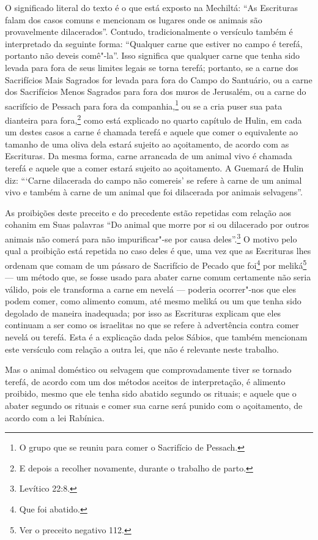 \begin{multicols}{2}
O significado literal do texto é o que está exposto na Mechiltá\starr: ``As
Escrituras falam dos casos comuns e mencionam os lugares onde os
animais são provavelmente dilacerados''. Contudo, tradicionalmente o
versículo também é interpretado da seguinte forma: ``Qualquer carne que
estiver no campo é terefá\starr, portanto não deveis comê"-la''. Isso
significa que qualquer carne que tenha sido levada para fora de seus
limites legais se torna terefá\starr; portanto, se a carne dos Sacrifícios
Mais Sagrados for levada para fora do Campo do Santuário, ou a carne
dos Sacrifícios Menos Sagrados para fora dos muros de Jerusalém, ou a
carne do sacrifício de Pessach\starr{} para fora da companhia,\footnote{O grupo que se reuniu para comer o Sacrifício de Pessach\starr.} ou se a cria puser sua pata dianteira para
fora,\footnote{E depois a recolher novamente, durante o trabalho de parto.} como está explicado no quarto capítulo de
Hulin\starr, em cada um destes casos a carne é chamada terefá\starr{} e aquele que
comer o equivalente ao tamanho de uma oliva dela estará sujeito ao
açoitamento, de acordo com as Escrituras. Da mesma forma, carne
arrancada de um animal vivo é chamada terefá\starr{} e aquele que a comer
estará sujeito ao açoitamento. A Guemará\starr{} de Hulin\starr{} diz: ```Carne
dilacerada do campo não comereis' se refere à carne de um animal vivo e
também à carne de um animal que foi dilacerada por animais selvagens''.

As proibições deste preceito e do precedente estão repetidas com relação
aos cohanim\starr{} em Suas palavras ``Do animal que morre por si ou
dilacerado por outros animais não comerá para não impurificar"-se por
causa deles''.\footnote{Levítico 22:8.} O motivo pelo qual a proibição está
repetida no caso deles é que, uma vez que as Escrituras lhes ordenam que
comam de um pássaro de Sacrifício de Pecado que
foi\footnote{Que foi abatido.} por meliká\starr\footnote{Ver o preceito negativo 112.} --- um
método que, se fosse usado para abater carne comum certamente não seria
válido, pois ele transforma a carne em nevelá\starr{} --- poderia
ocorrer"-nos que eles podem comer, como alimento comum, até mesmo
meliká\starr{} ou um que tenha sido degolado de maneira inadequada; por
isso as Escrituras explicam que eles continuam a ser como os israelitas
no que se refere à advertência contra comer nevelá\starr{} ou terefá\starr.
Esta é a explicação dada pelos Sábios, que também mencionam este
versículo com relação a outra lei, que não é relevante neste trabalho.

Mas o animal doméstico ou selvagem que comprovadamente tiver se tornado
terefá\starr, de acordo com um dos métodos aceitos de interpretação, é
alimento proibido, mesmo que ele tenha sido abatido segundo os rituais;
e aquele que o abater segundo os rituais e comer sua carne será punido
com o açoitamento, de acordo com a lei Rabínica.


\end{multicols}
